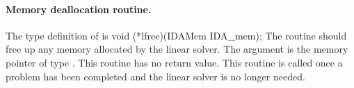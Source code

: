 
\paragraph{Memory deallocation routine.}
The type definition of  is
{
  void (*lfree)(IDAMem IDA\_mem);
}
{
  The routine  should free up any memory allocated by the linear
  solver.
}
{
  The argument  is the {\ida} memory pointer of type .
}
{
  This routine has no return value.
}
{
  This routine is called once a problem has been completed and the 
  linear solver is no longer needed.
}